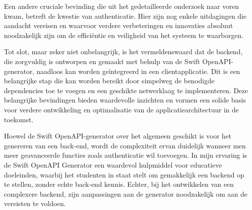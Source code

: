 Een andere cruciale bevinding die uit het gedetailleerde onderzoek naar voren kwam, betreft de kwestie van authenticatie. Hier zijn nog enkele uitdagingen die aandacht vereisen en waarvoor verdere verbeteringen en innovaties absoluut noodzakelijk zijn om de efficiëntie en veiligheid van het systeem te waarborgen.

Tot slot, maar zeker niet onbelangrijk, is het vermeldenswaard dat de backend, die zorgvuldig is ontworpen en gemaakt met behulp van de Swift OpenAPI-generator, naadloos kan worden geïntegreerd in een clientapplicatie. Dit is een belangrijke stap die kan worden bereikt door simpelweg de benodigde dependencies toe te voegen en een geschikte netwerklaag te implementeren. Deze belangrijke bevindingen bieden waardevolle inzichten en vormen een solide basis voor verdere ontwikkeling en optimalisatie van de applicatiearchitectuur in de toekomst.

Hoewel de Swift OpenAPI-generator over het algemeen geschikt is voor het genereren van een back-end, wordt de complexiteit ervan duidelijk wanneer men meer geavanceerde functies zoals authenticatie wil toevoegen. In mijn ervaring is de Swift OpenAPI Generator een waardevol hulpmiddel voor educatieve doeleinden, waarbij het studenten in staat stelt om gemakkelijk een backend op te stellen, zonder echte back-end kennis. Echter, bij het ontwikkelen van een complexere backend, zijn aanpassingen aan de generator noodzakelijk om aan de vereisten te voldoen.

